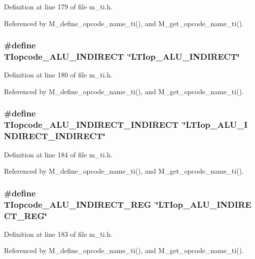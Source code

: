 Definition at line 179 of file m\_\-ti.h.

Referenced by M\_\-define\_\-opcode\_\-name\_\-ti(), and M\_\-get\_\-opcode\_\-name\_\-ti().
\subsubsection{\setlength{\rightskip}{0pt plus 5cm}\#define TIopcode\_\-ALU\_\-INDIRECT~\char`\"{}LTIop\_\-ALU\_\-INDIRECT\char`\"{}}\label{m__ti_8h_9a1b486e3f9d6c3cec080c3a73a74b31}




Definition at line 180 of file m\_\-ti.h.

Referenced by M\_\-define\_\-opcode\_\-name\_\-ti(), and M\_\-get\_\-opcode\_\-name\_\-ti().
\subsubsection{\setlength{\rightskip}{0pt plus 5cm}\#define TIopcode\_\-ALU\_\-INDIRECT\_\-INDIRECT~\char`\"{}LTIop\_\-ALU\_\-INDIRECT\_\-INDIRECT\char`\"{}}\label{m__ti_8h_6ee6504650aeb0da6260178accca3d93}




Definition at line 184 of file m\_\-ti.h.

Referenced by M\_\-define\_\-opcode\_\-name\_\-ti(), and M\_\-get\_\-opcode\_\-name\_\-ti().
\subsubsection{\setlength{\rightskip}{0pt plus 5cm}\#define TIopcode\_\-ALU\_\-INDIRECT\_\-REG~\char`\"{}LTIop\_\-ALU\_\-INDIRECT\_\-REG\char`\"{}}\label{m__ti_8h_f3a7f926bafe153731a9a80adf913e9c}




Definition at line 183 of file m\_\-ti.h.

Referenced by M\_\-define\_\-opcode\_\-name\_\-ti(), and M\_\-get\_\-opcode\_\-name\_\-ti().
